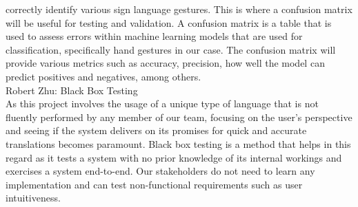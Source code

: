 \documentclass[12pt]{article}
\begin{document}
\begin{outline}[enumerate]
correctly identify various sign language gestures. This is where a confusion matrix will be useful for testing and validation. A confusion matrix is a table that is 
used to assess errors within machine learning models that are used for classification, specifically hand gestures in our case. The confusion matrix will provide
various metrics such as accuracy, precision, how well the model can predict positives and negatives, among others.\\
    \2 Robert Zhu: Black Box Testing\\
    As this project involves the usage of a unique type of language that is not fluently performed by any member of our team, focusing on the user’s perspective and 
    seeing if the system delivers on its promises for quick and accurate translations becomes paramount. Black box testing is a method that helps in this regard as it tests 
    a system with no prior knowledge of its internal workings and exercises a system end-to-end. Our stakeholders do not need to learn any implementation and can test non-functional 
    requirements such as user intuitiveness.\\


\end{outline}
\end{document}
